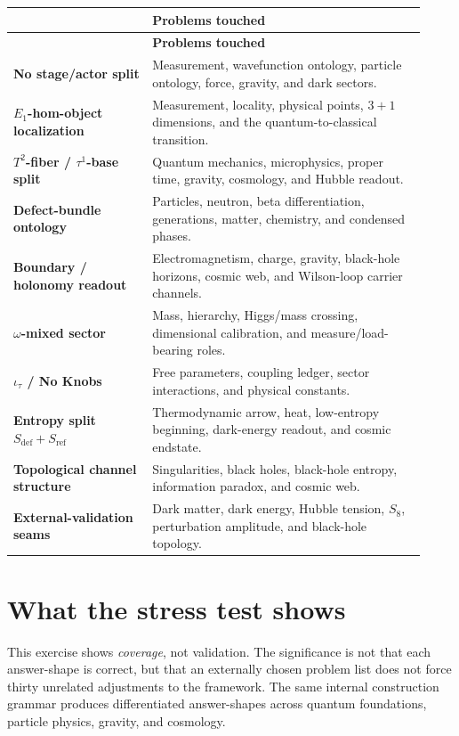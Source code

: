 \documentclass{pantarhei-researchnote}
\makeatletter
\newenvironment{mechanismledger}{%
  \renewcommand{\arraystretch}{1.05}%
  \scriptsize
  \begin{longtable}{@{}>{\RaggedRight\arraybackslash}p{0.31\linewidth}%
    >{\RaggedRight\arraybackslash}p{0.61\linewidth}@{}}
  \toprule
  {\sffamily\bfseries\color{pr-brand-700}Structural move} &
  {\sffamily\bfseries\color{pr-brand-700}Problems touched} \\
  \midrule
  \endfirsthead
  \toprule
  {\sffamily\bfseries\color{pr-brand-700}Structural move} &
  {\sffamily\bfseries\color{pr-brand-700}Problems touched} \\
  \midrule
  \endhead
}{%
  \bottomrule
  \end{longtable}
  \normalsize
}
\makeatother
\begin{document}
\begin{mechanismledger}
\textbf{No stage/actor split} & Measurement, wavefunction ontology, particle
ontology, force, gravity, and dark sectors. \\
\textbf{\(E_1\)-hom-object localization} & Measurement, locality, physical
points, \(3+1\) dimensions, and the quantum-to-classical transition. \\
\textbf{\(T^2\)-fiber / \(\tau^1\)-base split} & Quantum mechanics,
microphysics, proper time, gravity, cosmology, and Hubble readout. \\
\textbf{Defect-bundle ontology} & Particles, neutron, beta differentiation,
generations, matter, chemistry, and condensed phases. \\
\textbf{Boundary / holonomy readout} & Electromagnetism, charge, gravity,
black-hole horizons, cosmic web, and Wilson-loop carrier channels. \\
\textbf{\(\omega\)-mixed sector} & Mass, hierarchy, Higgs/mass crossing,
dimensional calibration, and measure/load-bearing roles. \\
\textbf{\(\iota_\tau\) / No Knobs} & Free parameters, coupling ledger, sector
interactions, and physical constants. \\
\textbf{Entropy split \(S_{\mathrm{def}}+S_{\mathrm{ref}}\)} &
Thermodynamic arrow, heat, low-entropy beginning, dark-energy readout, and
cosmic endstate. \\
\textbf{Topological channel structure} & Singularities, black holes,
black-hole entropy, information paradox, and cosmic web. \\
\textbf{External-validation seams} & Dark matter, dark energy, Hubble tension,
\(S_8\), perturbation amplitude, and black-hole topology. \\
\end{mechanismledger}

\clearpage

\section{What the stress test shows}

This exercise shows \emph{coverage}, not validation. The significance is not
that each answer-shape is correct, but that an externally chosen problem list
does not force thirty unrelated adjustments to the framework. The same
internal construction grammar produces differentiated answer-shapes across
quantum foundations, particle physics, gravity, and cosmology.
\end{document}
